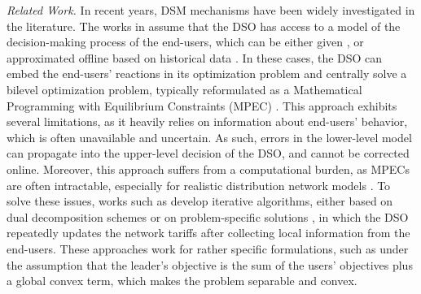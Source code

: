 \documentclass[letterpaper, 10 pt, conference]{ieeeconf}
\begin{document}
\smallskip
\noindent
\emph{Related Work.}
In recent years, DSM mechanisms have been widely investigated in the literature. The works in \cite{9993196, askeland2023stochastic, koolen2017machine, guo2019drivers} assume that the DSO has access to a model of the decision-making process of the end-users, which can be either given \cite{9993196, askeland2023stochastic}, or approximated offline based on historical data \cite{koolen2017machine, guo2019drivers}. In these cases, the DSO can embed the end-users' reactions in its optimization problem and centrally solve a bilevel optimization problem, typically reformulated as %
a Mathematical Programming with Equilibrium Constraints (MPEC) \cite{luo1996mathematical}. This approach exhibits several limitations, as it heavily relies on information about end-users' behavior, which is often unavailable and uncertain. As such, errors in the lower-level model can propagate into the upper-level decision of the DSO, and cannot be corrected online.
Moreover, this approach suffers from a computational burden, as MPECs are often intractable, especially for realistic distribution network models \cite{luo1996mathematical}. To solve these issues, works such as \cite{zhang2013robust, nguyen2017optimal, cianchi2025two, 10886163, alahmed2024network} develop iterative algorithms, either based on dual decomposition schemes \cite{zhang2013robust, nguyen2017optimal, cianchi2025two} or on problem-specific solutions \cite{10886163, alahmed2024network}, in which the DSO repeatedly updates the network tariffs after collecting local information from the end-users. These approaches work for rather specific formulations, such as under the assumption that the leader’s objective is the sum of the users’ objectives plus a global convex term, which makes the problem separable and convex. %
\end{document}
